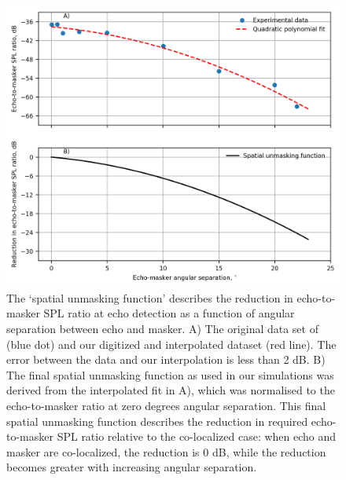 \documentclass[
]{book}
\begin{document}
\begin{figure}
\includegraphics[]{original_papers/CPN_figures/Figures_SI/Figure_S2_2panel_exptldata_on_top.png}
\centering
\caption{The ‘spatial unmasking function’ describes the reduction in echo-to-masker SPL ratio at echo detection as a function of angular separation between echo and masker. A) The original data set of \cite{suemer2009a} (blue dot) and our digitized and
interpolated dataset (red line). The error between the data and our interpolation is less than 2 dB. B) The final spatial unmasking function as used in our simulations was derived from the interpolated fit in A), which was normalised to the echo-to-masker ratio at zero degrees angular separation. This final spatial unmasking function describes the reduction in required echo-to-masker SPL ratio relative to the co-localized case: when echo and masker are co-localized, the reduction is 0 dB, while the reduction becomes greater with increasing angular separation.}
\label{cpn_figS2}
\end{figure}

\newpage
\end{document}
